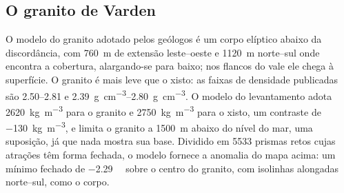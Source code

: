 \begin{omfigure}
\par{}\label{fig:b3:field-lab-methods-3:survey}
\end{omfigure}

\subsection{O granito de Varden}

O modelo do granito adotado pelos geólogos é um corpo elíptico abaixo da
discordância, com \qty{760}{m} de extensão leste--oeste e \qty{1120}{m}
norte--sul onde encontra a cobertura, alargando-se para baixo; nos
flancos do vale ele chega à superfície. O granito é mais leve que o xisto:
as faixas de densidade publicadas são \numrange{2.50}{2.81} e
\qtyrange{2.39}{2.80}{g.cm^{-3}}. O modelo do levantamento adota
\qty{2620}{kg.m^{-3}} para o granito e \qty{2750}{kg.m^{-3}} para o
xisto, um contraste de \qty{-130}{kg.m^{-3}}, e limita o granito a
\qty{1500}{m} abaixo do nível do mar, uma suposição, já que nada mostra sua
base. Dividido em \num{5533} prismas retos cujas atrações têm forma fechada,
o modelo fornece a anomalia do mapa acima: um mínimo fechado de
\qty{-2.29}{\milli\gal} sobre o centro do granito, com isolinhas
alongadas norte--sul, como o corpo.

